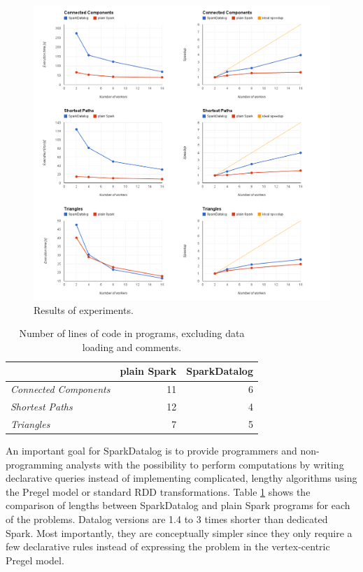 \begin{figure}[!htbp]
  \centering
    \includegraphics[width=\textwidth]{images/plots_all.png}
   \caption{Results of experiments. \label{img_plots_exp}}
\end{figure}


\begin{table}[!htbp]
  \centering
\begin{tabular}{|l|r|r|}
\hline   & \textbf{plain Spark} & \textbf{SparkDatalog} \\ 
\hline
 \textit{Connected Components} & 11 & 6 \\ 
 \textit{Shortest Paths} & 12 & 4 \\ 
 \textit{Triangles} & 7 & 5 \\ 
\hline 
\end{tabular} 
\caption{Number of lines of code in programs, excluding data loading and comments.}
\label{tab_proglen}
\end{table}

An important goal for SparkDatalog is to provide programmers and non-programming analysts with the possibility to perform computations by writing declarative queries instead of implementing complicated, lengthy algorithms using the Pregel model or standard RDD transformations. Table \ref{tab_proglen} shows the comparison of lengths between SparkDatalog and plain Spark programs for each of the problems. Datalog versions are 1.4 to 3 times shorter than dedicated Spark. Most importantly, they are conceptually simpler since they only require a few declarative rules instead of expressing the problem in the vertex-centric Pregel model.

